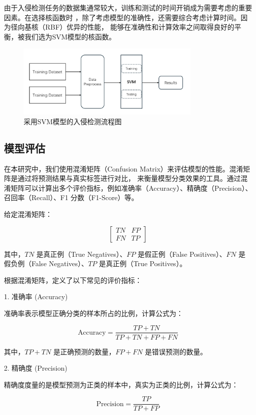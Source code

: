 \documentclass{article}
\begin{document}
由于入侵检测任务的数据集通常较大，训练和测试的时间开销成为需要考虑的重要因素。在选择核函数时
，除了考虑模型的准确性，还需要综合考虑计算时间。因为径向基核（RBF）优异的性能，
能够在准确性和计算效率之间取得良好的平衡，被我们选为SVM模型的核函数。
\begin{figure}[H]
  \centering
  \includegraphics[width=0.8\textwidth]{./png/model.png}
  \caption{采用SVM模型的入侵检测流程图}
  \label{fig:svm}
\end{figure}
\subsection{模型评估}

在本研究中，我们使用混淆矩阵（Confusion Matrix）来评估模型的性能。混淆矩阵是通过将预测结果与真实标签进行对比，
来衡量模型分类效果的工具。通过混淆矩阵可以计算出多个评价指标，例如准确率（Accuracy）、精确度（Precision）、召回率（Recall）、F1 分数（F1-Score）等。

给定混淆矩阵：

\[
\begin{bmatrix}
    TN & FP \\
    FN & TP
\end{bmatrix}
\]

其中，$TN$ 是真正例（True Negatives）、$FP$ 是假正例（False Positives）、$FN$ 是假负例（False Negatives）、$TP$ 是真正例（True Positives）。

根据混淆矩阵，定义了以下常见的评价指标：

1. 准确率 (Accuracy)

   准确率表示模型正确分类的样本所占的比例，计算公式为：

   \[
   \text{Accuracy} = \frac{TP + TN}{TP + TN + FP + FN}
   \]

   其中，$TP + TN$ 是正确预测的数量，$FP + FN$ 是错误预测的数量。

2. 精确度 (Precision)

   精确度度量的是模型预测为正类的样本中，真实为正类的比例，计算公式为：

   \[
   \text{Precision} = \frac{TP}{TP + FP}
   \]
\end{document}
